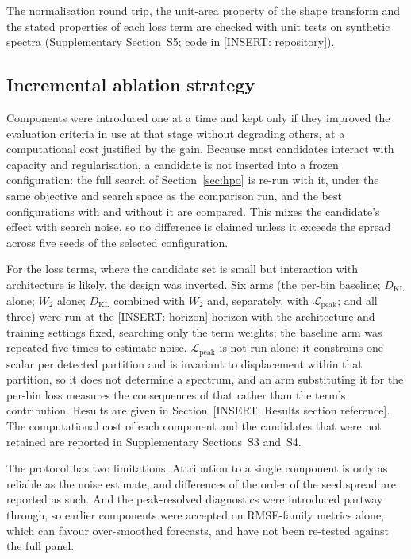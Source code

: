 The normalisation round trip, the unit-area property of the shape transform and the stated properties of each loss term are checked with unit tests on synthetic spectra (Supplementary Section~S5; code in [INSERT: repository]).

\subsection{Incremental ablation strategy}
\label{sec:ablation}
 
Components were introduced one at a time and kept only if they improved the evaluation criteria in use at that stage without degrading others, at a computational cost justified by the gain. Because most candidates interact with capacity and regularisation, a candidate is not inserted into a frozen configuration: the full search of Section~\ref{sec:hpo} is re-run with it, under the same objective and search space as the comparison run, and the best configurations with and without it are compared. This mixes the candidate's effect with search noise, so no difference is claimed unless it exceeds the spread across five seeds of the selected configuration.
 
For the loss terms, where the candidate set is small but interaction with architecture is likely, the design was inverted. Six arms (the per-bin baseline; $D_{\text{KL}}$ alone; $W_2$ alone; $D_{\text{KL}}$ combined with $W_2$ and, separately, with $\mathcal{L}_{\text{peak}}$; and all three) were run at the [INSERT: horizon] horizon with the architecture and training settings fixed, searching only the term weights; the baseline arm was repeated five times to estimate noise. $\mathcal{L}_{\text{peak}}$ is not run alone: it constrains one scalar per detected partition and is invariant to displacement within that partition, so it does not determine a spectrum, and an arm substituting it for the per-bin loss measures the consequences of that rather than the term's contribution. Results are given in Section~[INSERT: Results section reference]. The computational cost of each component and the candidates that were not retained are reported in Supplementary Sections~S3 and~S4.
 
The protocol has two limitations. Attribution to a single component is only as reliable as the noise estimate, and differences of the order of the seed spread are reported as such. And the peak-resolved diagnostics were introduced partway through, so earlier components were accepted on RMSE-family metrics alone, which can favour over-smoothed forecasts, and have not been re-tested against the full panel.
